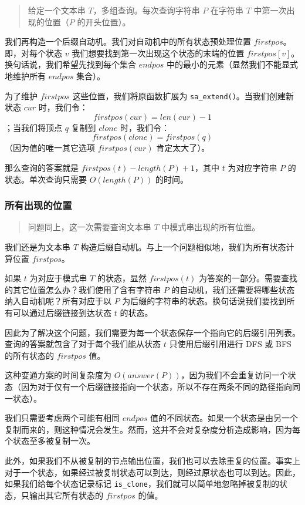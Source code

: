 \begin{quote}
给定一个文本串 \(T\)，多组查询。每次查询字符串 \(P\) 在字符串 \(T\)
中第一次出现的位置（\(P\) 的开头位置）。
\end{quote}

我们再构造一个后缀自动机。我们对自动机中的所有状态预处理位置
\(firstpos\)。即，对每个状态 \(v\)
我们想要找到第一次出现这个状态的末端的位置
\(firstpos[v]\)。换句话说，我们希望先找到每个集合 \(endpos\)
中的最小的元素（显然我们不能显式地维护所有 \(endpos\) 集合）。

为了维护 \(firstpos\) 这些位置，我们将原函数扩展为
\texttt{sa\_extend()}。当我们创建新状态 \(cur\) 时，我们令：
\[
firstpos(cur)=len(cur)-1
\]
；当我们将顶点 \(q\) 复制到 \(clone\) 时，我们令：
\[
firstpos(clone)=firstpos(q)
\]
（因为值的唯一其它选项 \(firstpos(cur)\) 肯定太大了）。

那么查询的答案就是 \(firstpos(t)-length(P)+1\)，其中 \(t\) 为对应字符串
\(P\) 的状态。单次查询只需要 \(O(length(P))\) 的时间。

\subsubsection{所有出现的位置}

\begin{quote}
问题同上，这一次需要查询文本串 \(T\) 中模式串出现的所有位置。
\end{quote}

我们还是为文本串 \(T\)
构造后缀自动机。与上一个问题相似地，我们为所有状态计算位置
\(firstpos\)。

如果 \(t\) 为对应于模式串 \(T\) 的状态，显然 \(firstpos(t)\)
为答案的一部分。需要查找的其它位置怎么办？我们使用了含有字符串 \(P\)
的自动机，我们还需要将哪些状态纳入自动机呢？所有对应于以 \(P\)
为后缀的字符串的状态。换句话说我们要找到所有可以通过后缀链接到达状态
\(t\) 的状态。

因此为了解决这个问题，我们需要为每一个状态保存一个指向它的后缀引用列表。查询的答案就包含了对于每个我们能从状态
\(t\) 只使用后缀引用进行 DFS 或 BFS 的所有状态的 \(firstpos\) 值。

这种变通方案的时间复杂度为
\(O(answer(P))\)，因为我们不会重复访问一个状态（因为对于仅有一个后缀链接指向一个状态，所以不存在两条不同的路径指向同一状态）。

我们只需要考虑两个可能有相同 \(endpos\)
值的不同状态。如果一个状态是由另一个复制而来的，则这种情况会发生。然而，这并不会对复杂度分析造成影响，因为每个状态至多被复制一次。

此外，如果我们不从被复制的节点输出位置，我们也可以去除重复的位置。事实上对于一个状态，如果经过被复制状态可以到达，则经过原状态也可以到达。因此，如果我们给每个状态记录标记
\texttt{is\_clone}，我们就可以简单地忽略掉被复制的状态，只输出其它所有状态的
\(firstpos\) 的值。

